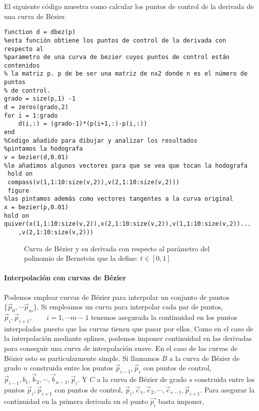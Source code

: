 El siguiente código muestra como calcular los puntos de control de la derivada de una curva de Bézier.
\begin{verbatim}
function d = dbez(p)
%esta función obtiene los puntos de control de la derivada con respecto al
%parametro de una curva de bezier cuyos puntos de control están contenidos 
% la matriz p. p de be ser una matriz de nx2 donde n es el número de puntos
% de control.
grado = size(p,1) -1
d = zeros(grado,2)
for i = 1:grado
    d(i,:) = (grado-1)*(p(i+1,:)-p(i,:))
end
%Codigo añadido para dibujar y analizar los resultados
%pintamos la hodografa
v = bezier(d,0.01)
%le añadimos algunos vectores para que se vea que tocan la hodografa
 hold on
 compass(v(1,1:10:size(v,2)),v(2,1:10:size(v,2)))
 figure
%las pintamos además como vectores tangentes a la curva original
x = bezier(p,0.01)
hold on
quiver(x(1,1:10:size(v,2)),x(2,1:10:size(v,2)),v(1,1:10:size(v,2))...
    ,v(2,1:10:size(v,2)))
\end{verbatim}

\begin{figure}
\centering
{} \qquad 
{}
\caption{Curva de Bézier y su derivada con respecto al parámetro del polinomio de Bernstein que la define: $t \in [0,1]$} 
\label{fig:bzder}
\end{figure} 

\paragraph{Interpolación con curvas de Bézier} Podemos emplear curvas de Bézier para interpolar un conjunto de puntos $\lbrace \vec{p}_0, \cdots  \vec{p}_m\rbrace$. Si empleamos un curva para interpolar cada par de puntos, $\vec{p}_i, \vec{p}_{i+1}, \qquad i =1, \cdots m-1$ tenemos asegurada la continuidad en los puntos interpolados puesto que las curvas tienen que pasar por ellos. Como en el caso de la interpolación mediante splines, podemos imponer continuidad en las derivadas para conseguir una curva de interpolación suave. En el caso de las curvas de Bézier esto es particularmente simple. Si llamamos $B$ a la curva de Bézier de grado $n$ construida entre los puntos $\vec{p}_{i-1}, \vec{p}_{i}$  con puntos de control, $\vec{p}_{i-1}, b_1, \vec{b}_2,\cdots, \vec{b}_{n-1},\vec{p}_{i}$. Y  $C$ a la curva de Bézier de grado $s$ construida entre los puntos $\vec{p}_{i}, \vec{p}_{i+1}$  con puntos de control, $\vec{p}_{i}, \vec{c}_1, \vec{c}_2,\cdots, \vec{c}_{s-1},\vec{p}_{i+1}$. Para asegurar la continuidad en la primera derivada en el punto $\vec{p_i}$ basta imponer,

